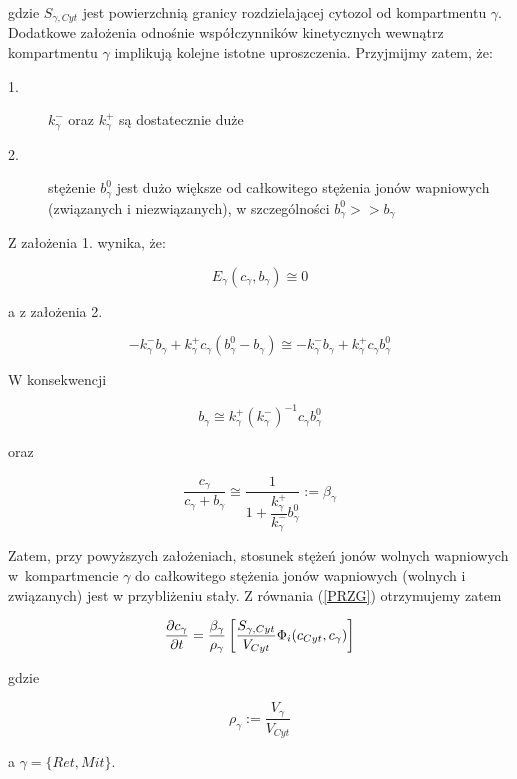 \noindent gdzie $S_{\gamma,Cyt}$ jest powierzchnią granicy rozdzielającej cytozol od kompartmentu $\gamma$. Dodatkowe założenia odnośnie współczynników kinetycznych wewnątrz kompartmentu $\gamma$ implikują kolejne istotne uproszczenia. Przyjmijmy zatem, że: 

\begin{description}
	\item[1.] $k^{-}_{\gamma}$ oraz $k^{+}_{\gamma}$ są dostatecznie duże
	
	\item[2.] stężenie $b^0_{\gamma}$ jest dużo większe od całkowitego stężenia jonów wapniowych 
	(związanych i niezwiązanych), w szczególności $b^0_{\gamma} >> b_\gamma$ 
\end{description} 

\medskip 

\noindent Z założenia 1. wynika, że: 


\[  E_\gamma (c_\gamma, b_\gamma)  \cong 0 \] 

\noindent a z założenia 2. 

\[ 
- k^{-}_{\gamma} b_{\gamma} + k^{+}_{\gamma} c_\gamma (b^0_{\gamma} -b_{\gamma}) \cong 
- k^{-}_{\gamma} b_{\gamma} + k^{+}_{\gamma} c_\gamma b^0_{\gamma} 
\] 

\noindent W konsekwencji 

\[ b_{\gamma} \cong k^{+}_{\gamma}(k^{-}_{\gamma})^{-1} c_\gamma b^0_{\gamma} \] 

\noindent oraz 

\begin{equation} \label{betag} 
\dfrac{c_\gamma}{c_\gamma + b_\gamma} \cong 
\dfrac{1}{1+ \dfrac{k^{+}_{\gamma}}{k^{-}_{\gamma}} b^0_{\gamma} }:= \beta_\gamma
\end{equation}

\noindent Zatem, przy powyższych założeniach, stosunek stężeń jonów wolnych wapniowych w~kompartmencie $\gamma$ do całkowitego stężenia jonów wapniowych (wolnych i związanych) jest w przybliżeniu stały. Z równania (\ref{PRZG}) otrzymujemy zatem 

\begin{equation} \label{PRZGK}
\frac{\partial c_\gamma}{\partial t} = \frac{\beta_\gamma}{\rho_\gamma} 
\left[\frac{S_{\gamma,Cyt}}{V_{Cyt}} 
\Phi_i(c_{Cyt},c_\gamma) \right] 
\end{equation} 

\noindent gdzie 

\[  
\rho_\gamma := \frac{V_{\gamma}}{V_{Cyt}}
\] 

\noindent a $\gamma = \{ Ret,Mit \}$. 

